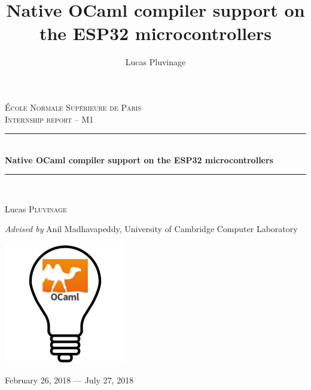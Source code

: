 \documentclass[a4paper]{article}
\title{Native OCaml compiler support on the ESP32 microcontrollers}
\author{Lucas Pluvinage}
\date{}
\newcommand{\HRule}{\rule{\linewidth}{0.5mm}}
\begin{document}
\begin{titlepage}
  \begin{sffamily}
  \begin{center}


    \textsc{\LARGE École Normale Supérieure de Paris}\\[2cm]

    \textsc{\Large Internship report -- M1}\\[1.5cm]

    \HRule \\[0.4cm]
    { \huge \bfseries Native OCaml compiler support on the ESP32 microcontrollers\\[0.4cm] }

    \HRule \\[2cm]

    \begin{minipage}{0.4\textwidth}
      \begin{flushleft} \large
        Lucas \textsc{Pluvinage}\\
      \end{flushleft}
    \end{minipage}
    \begin{minipage}{0.4\textwidth}
      \begin{flushright} \large
        \emph{Advised by } Anil Madhavapeddy, University of Cambridge Computer Laboratory
      \end{flushright}
    \end{minipage}

    \vspace{4cm}
    
    \includegraphics[width=0.2\columnwidth]{lightbulb.png}
    
    \vfill

    {\large February 26, 2018 — July 27, 2018}

  \end{center}
  \end{sffamily}
\end{titlepage}
\end{document}

